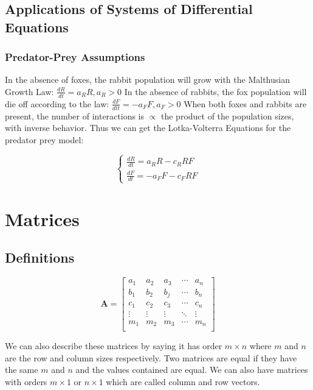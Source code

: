 \documentclass[12pt,landscape,twocolumn]{article}
\begin{document}
    \subsection{Applications of Systems of Differential Equations}
        \subsubsection{Predator-Prey Assumptions}
        In the absence of foxes, the rabbit population will grow with the Malthusian Growth Law:
        $
        \frac{dR}{dt} = a_R R, a_R > 0
        $
        In the absence of rabbits, the fox population will die off according to the law:
        $
        \frac{dF}{dtt} = -a_F F, a_F > 0
        $
        When both foxes and rabbits are present, the number of interactions is $\propto$ the product of the population sizes, with inverse behavior. Thus we can get the Lotka-Volterra Equations for the predator prey model:

        \begin{equation}\label{eq:LVeq}
        \begin{cases}
        \frac{dR}{dt} = a_R R - c_R RF\\
        \frac{dF}{dt} = -a_F F - c_F RF
        \end{cases}
        \end{equation}

\section{Matrices}
    \subsection{Definitions}
    \begin{equation}\label{eq:matrixdef}
    \mathbf{A} =
    \left[ \begin{matrix}
        a_1 & a_2 & a_3 & \cdots & a_n\\
        b_1 & b_2 & b_j & \cdots & b_n\\
        c_1 & c_2 & c_3 & \cdots & c_n\\
        \vdots & \vdots & \vdots & \ddots & \vdots\\
        m_1 & m_2 & m_3 & \cdots & m_n\\
    \end{matrix} \right]
    \end{equation}

    We can also describe these matrices by saying it has order $m \times n$ where $m$ and $n$ are the row and column sizes respectively. Two matrices are equal if they have the same $m$ and $n$ and the values contained are equal. We can also have matrices with orders $m \times 1$ or $n \times 1$ which are called column and row vectors.
\end{document}
